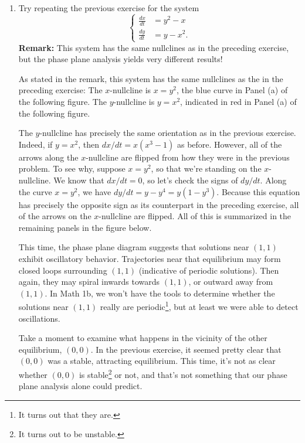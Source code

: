 \documentclass[main]{subfiles}
\begin{document}
\begin{enumerate}
\begin{enumerate}
  \end{enumerate}


\item 
\begin{problem}
Try repeating the previous exercise for the system
$$
  \left\{ \begin{aligned}
  \frac{dx}{dt} & = y^2 - x \\
  \frac{dy}{dt} & = y - x^2.
  \end{aligned} \right.
$$
{\bf Remark:}  This system has the same nullclines as in the preceding exercise,
but the phase plane analysis yields very different results!
\end{problem}


    \begin{solution}
    As stated in the remark, this system has the same nullclines as the
    in the preceding exercise:  The $x$-nullcline is $x = y^2$, the blue
    curve in Panel (a) of the following figure.  The $y$-nullcline is
    $y = x^2$, indicated in red in Panel (a) of the following figure.
    
    The $y$-nullcline has precisely the same orientation as in the 
    previous exercise.  Indeed, if $y = x^2$, then $dx/dt = x(x^3 - 1)$ 
    as before.  However, all of the arrows along the $x$-nullcline are
    flipped from how they were in the previous problem.  To see why,
    suppose $x = y^2$, so that we're standing on the $x$-nullcline.  We
    know that $dx/dt = 0$, so let's check the signs of $dy/dt$.  Along
    the curve $x = y^2$, we have $dy/dt = y - y^4 = y(1-y^3)$.  Because
    this equation has precisely the opposite sign as its counterpart in
    the preceding exercise, all of the arrows on the $x$-nullcline are
    flipped.  All of this is summarized in the remaining panels in the
    figure below.  

    This time, the phase plane diagram suggests that solutions near
    $(1,1)$ exhibit oscillatory behavior.  Trajectories near that
    equilibrium may form closed loops surrounding $(1,1)$ (indicative of
    periodic solutions).  Then again, they may spiral inwards towards
    $(1,1)$, or outward away from $(1,1)$.  In Math 1b, we won't have
    the tools to determine whether the solutions near $(1,1)$ really 
    are periodic\footnote{It turns out that they are.}, but at least we
    were able to detect oscillations.

    Take a moment to examine what happens in the vicinity of the other
    equilibrium, $(0,0)$.  In the previous exercise, it seemed pretty
    clear that $(0,0)$ was a stable, attracting equilibrium.  This
    time, it's not as clear whether $(0,0)$ is stable\footnote{It turns 
    out to be unstable.} or not, and that's not something that our 
    phase plane analysis alone could predict.
    

\end{solution}
\end{enumerate}
\end{document}
